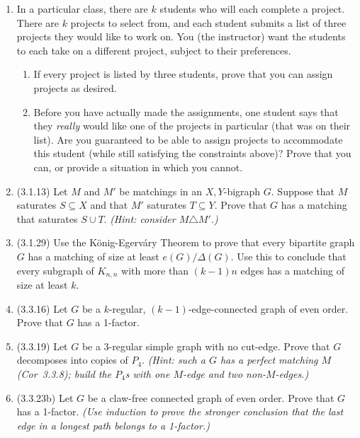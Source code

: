 \documentclass[11pt]{amsart}%
\begin{document}
\begin{enumerate}


\item In a particular class, there are $k$ students who will each complete a project.  There are $k$ projects to select from, and each student submits a list of three projects they would like to work on.  You (the instructor) want the students to each take on a different project, subject to their preferences.
\begin{enumerate}
\item If every project is listed by three students, prove that you can assign projects as desired.
\item Before you have actually made the assignments, one student says that they \emph{really} would like one of the projects in particular (that was on their list).  Are you guaranteed to be able to assign projects to accommodate this student (while still satisfying the constraints above)?  Prove that you can, or provide a situation in which you cannot.
\end{enumerate}

\item (3.1.13) Let $M$ and $M'$ be matchings in an $X,Y$-bigraph $G$.  Suppose that $M$ saturates $S\subseteq X$ and that $M'$ saturates $T\subseteq Y$.  Prove that $G$ has a matching that saturates $S\cup T$.  \textit{(Hint: consider $M\triangle M'$.)}

\item (3.1.29) Use the K\"onig-Egerv\'ary Theorem to prove that every bipartite graph $G$ has a matching of size at least $e(G)/\Delta(G)$.  Use this to conclude that every subgraph of $K_{n,n}$ with more than $(k-1)n$ edges has a matching of size at least $k$.

\item (3.3.16) Let $G$ be a $k$-regular, $(k-1)$-edge-connected graph of even order.  Prove that $G$ has a 1-factor.

\item (3.3.19) Let $G$ be a 3-regular simple graph with no cut-edge.  Prove that $G$ decomposes into copies of $P_4$.  \textit{(Hint: such a $G$ has a perfect matching $M$ (Cor~3.3.8); build the $P_4$s with one $M$-edge and two non-$M$-edges.)}

\item (3.3.23b) Let $G$ be a claw-free connected graph of even order.  Prove that $G$ has a 1-factor.  \textit{(Use induction to prove the stronger conclusion that the last edge in a longest path belongs to a 1-factor.)}

\end{enumerate}
\end{document}
